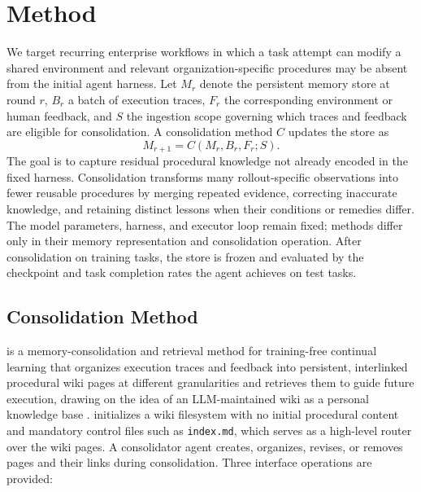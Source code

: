 \section{Method}
\label{sec:method}


We target recurring enterprise workflows in which a task attempt can
modify a shared environment and relevant organization-specific procedures
may be absent from the initial agent harness.
Let $M_r$ denote the persistent memory store at round $r$, $B_r$ a batch
of execution traces, $F_r$ the corresponding environment or human
feedback, and $S$ the ingestion scope governing which traces and feedback
are eligible for consolidation. A consolidation method $C$ updates the
store as
\begin{equation}
    M_{r+1}=C(M_r,B_r,F_r;S).
    \label{eq:consolidation}
\end{equation}
The goal is to capture residual procedural knowledge not already encoded
in the fixed harness. Consolidation transforms many rollout-specific
observations into fewer reusable procedures by merging repeated evidence,
correcting inaccurate knowledge, and retaining distinct lessons when their
conditions or remedies differ. The model parameters, harness, and executor
loop remain fixed; methods differ only in their memory representation and
consolidation operation. After consolidation on training tasks, the store
is frozen and evaluated by the checkpoint and task completion rates the
agent achieves on test tasks.

\subsection{\method{} Consolidation Method}
\label{sec:wasp-method}

\method{} is a memory-consolidation and retrieval method for training-free
continual learning that organizes execution traces and feedback into
persistent, interlinked procedural wiki pages at different granularities and
retrieves them to guide future execution, drawing on the idea of an
LLM-maintained wiki as a personal knowledge base \citep{karpathy2026llmwiki}.
\method{} initializes a wiki filesystem with no initial procedural content and
mandatory control files such as \texttt{index.md}, which serves as a
high-level router over the wiki pages. A \method{} consolidator agent creates,
organizes, revises, or removes pages and their links during consolidation.
Three interface operations are provided:

